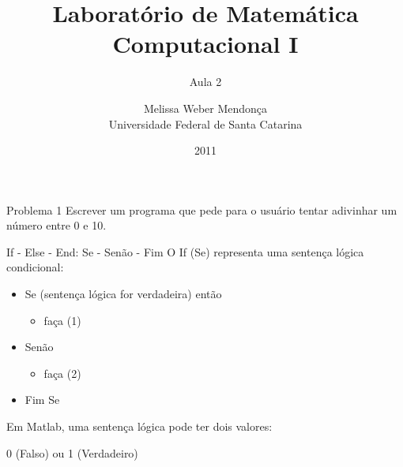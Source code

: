 \documentclass[hyperref={pdfpagelabels=false}]{beamer}
\title{Laboratório de Matemática Computacional I}
\subtitle{Aula 2}
\author[M. Weber Mendonça]{Melissa Weber Mendonça\\
Universidade Federal de Santa Catarina}
\date{2011}
\begin{document}
\setmonofont{Inconsolata}

\begin{frame}
  \titlepage
\end{frame}

\begin{frame}{Problema 1}
  Escrever um programa que pede para o usuário tentar adivinhar um número entre 0 e 10.
\end{frame}

\begin{frame}{If - Else - End: Se - Senão - Fim}
  O If (Se) representa uma sentença lógica condicional: 
  \begin{center}
    \begin{minipage}{0.7\textwidth}
      \begin{itemize}
      \item[] Se (sentença lógica for verdadeira) então
	      \begin{itemize}
	      \item[] faça (1)
	      \end{itemize}
      \item[] Senão
	      \begin{itemize}
	      \item[] faça (2) 
	      \end{itemize}
      \item[] Fim Se 
      \end{itemize}
    \end{minipage}
    \vfill
    \begin{minipage}{0.8\textwidth}
      \begin{alertblock}{}
        Em Matlab, uma sentença lógica pode ter dois valores:\\
        \begin{center} 0 (Falso) ou 1 (Verdadeiro)\end{center}
      \end{alertblock}
    \end{minipage}
  \end{center}
\end{frame}
\end{document}
